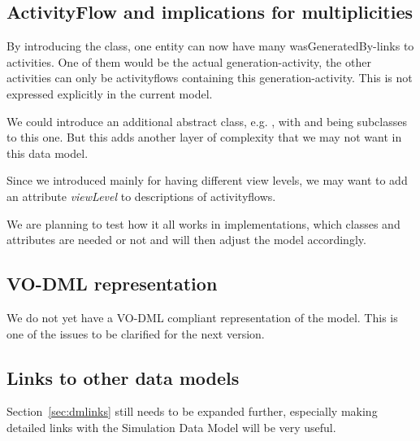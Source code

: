 
\subsection{ActivityFlow and implications for multiplicities}
By introducing the  class, one entity can now have many 
wasGeneratedBy-links to activities. One of them would be the actual generation-activity, 
the other activities can only be activityflows containing this generation-activity.
This is not expressed explicitly in the current model. 

We could introduce an additional abstract class, e.g. , with  and 
 being subclasses to this one. But this adds another layer of complexity 
that we may not want in this data model.

Since we introduced  mainly for having different view levels, 
we may want to add an attribute \emph{viewLevel} to descriptions of activityflows.

We are planning to test how it all works in implementations, which classes and attributes are 
needed or not and will then adjust the model 
accordingly.

\subsection{VO-DML representation}
We do not yet have a VO-DML compliant representation of the model. This is one 
of the issues to be clarified for the next version.

\subsection{Links to other data models}
Section~\ref{sec:dmlinks} still needs to be expanded further, especially making detailed links with the 
Simulation Data Model will be very useful.
